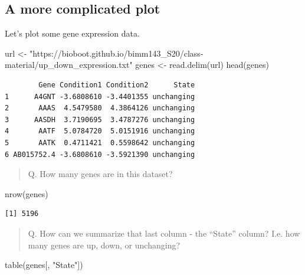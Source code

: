 \documentclass[
  letterpaper,
  DIV=11,
  numbers=noendperiod]{scrartcl}
\newenvironment{Shaded}{\begin{snugshade}}{\end{snugshade}}
\newcommand{\FunctionTok}[1]{\textcolor[rgb]{0.28,0.35,0.67}{#1}}
\newcommand{\NormalTok}[1]{\textcolor[rgb]{0.00,0.23,0.31}{#1}}
\newcommand{\OtherTok}[1]{\textcolor[rgb]{0.00,0.23,0.31}{#1}}
\newcommand{\StringTok}[1]{\textcolor[rgb]{0.13,0.47,0.30}{#1}}
\begin{document}
\hypertarget{a-more-complicated-plot}{%
\subsection{A more complicated plot}\label{a-more-complicated-plot}}

Let's plot some gene expression data.

\begin{Shaded}
\begin{Highlighting}[]
\NormalTok{url }\OtherTok{\textless{}{-}} \StringTok{"https://bioboot.github.io/bimm143\_S20/class{-}material/up\_down\_expression.txt"}
\NormalTok{genes }\OtherTok{\textless{}{-}} \FunctionTok{read.delim}\NormalTok{(url)}
\FunctionTok{head}\NormalTok{(genes)}
\end{Highlighting}
\end{Shaded}

\begin{verbatim}
        Gene Condition1 Condition2      State
1      A4GNT -3.6808610 -3.4401355 unchanging
2       AAAS  4.5479580  4.3864126 unchanging
3      AASDH  3.7190695  3.4787276 unchanging
4       AATF  5.0784720  5.0151916 unchanging
5       AATK  0.4711421  0.5598642 unchanging
6 AB015752.4 -3.6808610 -3.5921390 unchanging
\end{verbatim}

\begin{quote}
Q. How many genes are in this dataset?
\end{quote}

\begin{Shaded}
\begin{Highlighting}[]
\FunctionTok{nrow}\NormalTok{(genes)}
\end{Highlighting}
\end{Shaded}

\begin{verbatim}
[1] 5196
\end{verbatim}

\begin{quote}
Q. How can we summarize that last column - the ``State'' column? I.e.
how many genes are up, down, or unchanging?
\end{quote}

\begin{Shaded}
\begin{Highlighting}[]
\FunctionTok{table}\NormalTok{(genes[, }\StringTok{"State"}\NormalTok{])}
\end{Highlighting}
\end{Shaded}
\end{document}
